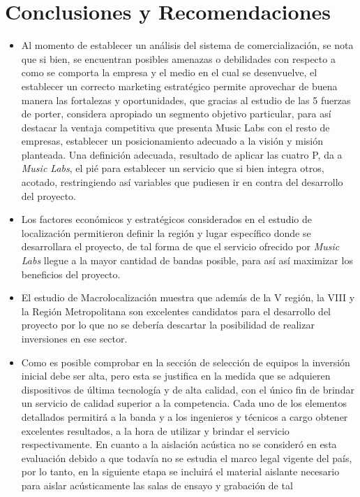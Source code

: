 \section{Conclusiones y Recomendaciones}
\begin{itemize}
	\item Al momento de establecer un análisis del sistema de comercialización, 
se nota que si bien, se encuentran posibles amenazas o debilidades con respecto a como se
 comporta la empresa y el medio en el cual se desenvuelve, el establecer un correcto marketing 
estratégico permite aprovechar de buena manera las fortalezas y oportunidades, que gracias al
 estudio de las 5 fuerzas de porter, considera apropiado un segmento objetivo particular,
 para así destacar la ventaja competitiva que presenta Music Labs con el resto de empresas, 
establecer un posicionamiento adecuado a la visión y misión planteada. Una definición adecuada,
 resultado de aplicar las cuatro P, da a \emph{Music Labs}, el pié para establecer un servicio que si
 bien integra otros, acotado, restringiendo así variables que pudiesen ir en contra del desarrollo 
del proyecto.
	\item Los factores económicos y estratégicos considerados en el estudio de localización permitieron definir la región y lugar específico
	donde se desarrollara el proyecto, de tal forma de que el servicio ofrecido por \emph{Music Labs} llegue a la mayor cantidad de bandas
	posible, para así así maximizar los beneficios del proyecto.
	\item El estudio de Macrolocalización muestra que además de la V región, la VIII y la Región Metropolitana son excelentes candidatos para
	el desarrollo del proyecto por lo que no se debería descartar la posibilidad de realizar inversiones en ese sector.
	\item Como es posible comprobar en la sección de selección de equipos la inversión
	  inicial debe ser alta, pero esta se justifica en la medida que se adquieren dispositivos
	  de última tecnología y de alta calidad, con el único fin de brindar un servicio
	  de calidad superior a la competencia. Cada uno de los elementos detallados permitirá
	  a la banda y a los ingenieros y técnicos a cargo obtener excelentes resultados, a la hora
	  de utilizar y brindar el servicio respectivamente. En cuanto a la aislación acústica
	  no se consideró en esta evaluación debido a que todavía no se estudia el marco legal
	  vigente del país, por lo tanto, en la siguiente etapa se incluirá el material
	  aislante necesario para aislar acústicamente las salas de ensayo y grabación de tal

\end{itemize}

